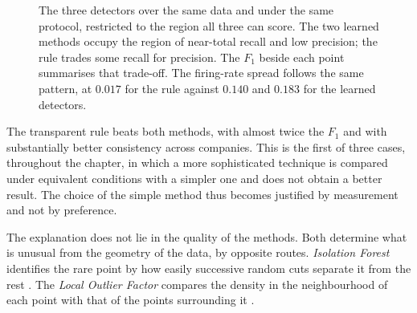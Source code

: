 \begin{figure}[htbp]
\centering
{}
\caption[The transparent rule against two learned detectors]{The three detectors over the same data
and under the same protocol, restricted to the region all three can score. The two learned methods
occupy the region of near-total recall and low precision; the rule trades some recall for
precision. The $F_1$ beside each point summarises that trade-off. The firing-rate spread follows
the same pattern, at $0.017$ for the rule against $0.140$ and $0.183$ for the learned
detectors.}
\label{fig:av_detetores}
\end{figure}

The transparent rule beats both methods, with almost twice the $F_1$ and with substantially better
consistency across companies. This is the first of three cases, throughout the chapter, in which a
more sophisticated technique is compared under equivalent conditions with a simpler one and does
not obtain a better result. The choice of the simple method thus becomes justified by measurement
and not by preference.

The explanation does not lie in the quality of the methods. Both determine what is unusual from
the geometry of the data, by opposite routes. \emph{Isolation Forest} identifies the rare point by
how easily successive random cuts separate it from the rest \autocite{liu2008isolation}. The
\emph{Local Outlier Factor} compares the density in the neighbourhood of each point with that of
the points surrounding it \autocite{breunig2000lof}.


